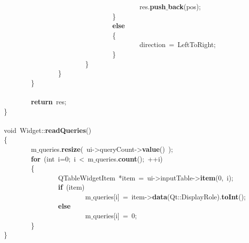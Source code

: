 \mbox{}\ \ \ \ \ \ \ \ \ \ \ \ \ \ \ \ \ \ \ \ \ \ \ \ \ \ \ \ \ \ \ \ \ \ \ \ \ \ \ \ res.\textbf{push$\_$back}(pos); \\
\mbox{}\ \ \ \ \ \ \ \ \ \ \ \ \ \ \ \ \ \ \ \ \ \ \ \ \ \ \ \ \ \ \ \ \} \\
\mbox{}\ \ \ \ \ \ \ \ \ \ \ \ \ \ \ \ \ \ \ \ \ \ \ \ \ \ \ \ \ \ \ \ \textbf{else} \\
\mbox{}\ \ \ \ \ \ \ \ \ \ \ \ \ \ \ \ \ \ \ \ \ \ \ \ \ \ \ \ \ \ \ \ \{ \\
\mbox{}\ \ \ \ \ \ \ \ \ \ \ \ \ \ \ \ \ \ \ \ \ \ \ \ \ \ \ \ \ \ \ \ \ \ \ \ \ \ \ \ direction\ =\ LeftToRight; \\
\mbox{}\ \ \ \ \ \ \ \ \ \ \ \ \ \ \ \ \ \ \ \ \ \ \ \ \ \ \ \ \ \ \ \ \} \\
\mbox{}\ \ \ \ \ \ \ \ \ \ \ \ \ \ \ \ \ \ \ \ \ \ \ \ \} \\
\mbox{}\ \ \ \ \ \ \ \ \ \ \ \ \ \ \ \ \} \\
\mbox{}\ \ \ \ \ \ \ \ \} \\
\mbox{} \\
\mbox{}\ \ \ \ \ \ \ \ \textbf{return}\ res; \\
\mbox{}\} \\
\mbox{} \\
\mbox{}void\ Widget::\textbf{readQueries}() \\
\mbox{}\{ \\
\mbox{}\ \ \ \ \ \ \ \ m$\_$queries.\textbf{resize}(\ ui-\textgreater{}queryCount-\textgreater{}\textbf{value}()\ ); \\
\mbox{}\ \ \ \ \ \ \ \ \textbf{for}\ (int\ i=0;\ i\ \textless{}\ m$\_$queries.\textbf{count}();\ ++i) \\
\mbox{}\ \ \ \ \ \ \ \ \{ \\
\mbox{}\ \ \ \ \ \ \ \ \ \ \ \ \ \ \ \ QTableWidgetItem\ *item\ =\ ui-\textgreater{}inputTable-\textgreater{}\textbf{item}(0,\ i); \\
\mbox{}\ \ \ \ \ \ \ \ \ \ \ \ \ \ \ \ \textbf{if}\ (item) \\
\mbox{}\ \ \ \ \ \ \ \ \ \ \ \ \ \ \ \ \ \ \ \ \ \ \ \ m$\_$queries[i]\ =\ item-\textgreater{}\textbf{data}(Qt::DisplayRole).\textbf{toInt}(); \\
\mbox{}\ \ \ \ \ \ \ \ \ \ \ \ \ \ \ \ \textbf{else} \\
\mbox{}\ \ \ \ \ \ \ \ \ \ \ \ \ \ \ \ \ \ \ \ \ \ \ \ m$\_$queries[i]\ =\ 0; \\
\mbox{}\ \ \ \ \ \ \ \ \} \\
\mbox{}\} \\
